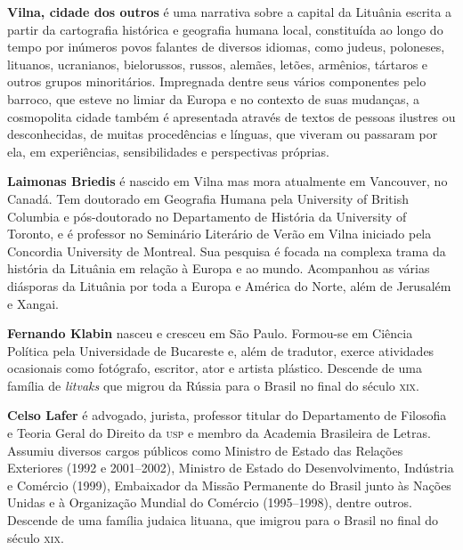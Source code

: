 \textbf{Vilna, cidade dos outros} é uma narrativa sobre a capital da Lituânia escrita a partir da cartografia histórica e geografia humana local, constituída ao longo do tempo por inúmeros povos falantes de diversos idiomas, como judeus, poloneses, lituanos, ucranianos, bielorussos, russos, alemães, letões, armênios, tártaros e outros grupos minoritários. Impregnada dentre seus vários componentes pelo barroco, que esteve no limiar da Europa e no contexto de suas mudanças, a cosmopolita cidade também é apresentada através de textos de pessoas ilustres ou desconhecidas, de muitas procedências e línguas, que viveram ou passaram por ela, em experiências, sensibilidades e perspectivas próprias.

\textbf{Laimonas Briedis} é nascido em Vilna mas mora atualmente em Vancouver, no Canadá. Tem doutorado em Geografia Humana pela University of British Columbia e pós-doutorado no Departamento de História da University of Toronto, e é professor no Seminário Literário de Verão em Vilna iniciado pela Concordia University de Montreal. Sua pesquisa é focada na complexa trama da história da Lituânia em relação à Europa e ao mundo. Acompanhou as várias diásporas da Lituânia por toda a Europa e América do Norte, além de Jerusalém e Xangai.

\textbf{Fernando Klabin} nasceu e cresceu em São Paulo. Formou-se em Ciência Política pela Universidade de Bucareste e, além de tradutor, exerce atividades ocasionais como fotógrafo, escritor, ator e artista plástico. Descende de uma família de \textit{litvaks} que migrou da Rússia para o Brasil no final do século \textsc{xix}.

\textbf{Celso Lafer} é advogado, jurista, professor titular do Departamento de Filosofia e Teoria Geral do Direito da \textsc{usp} e membro da Academia Brasileira de Letras. Assumiu diversos cargos públicos como Ministro de Estado das Relações Exteriores (1992 e 2001--2002), Ministro de Estado do Desenvolvimento, Indústria e Comércio (1999), Embaixador da Missão Permanente do Brasil junto às Nações Unidas e à Organização Mundial do Comércio (1995--1998), dentre outros. Descende de uma família judaica lituana, que imigrou para o Brasil no final do século \textsc{xix}.

\textbf{}
